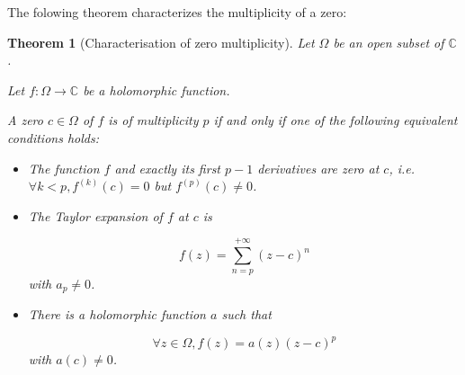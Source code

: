 \documentclass{article}
\newtheorem*{thm*}{Theorem}
\begin{document}
The folowing theorem characterizes the multiplicity of a zero:
\begin{thm*}
    [Characterisation of zero multiplicity]
    Let $\Omega$ be an open subset of $\mathbb{C}$.

    Let $f: \Omega \rightarrow \mathbb{C}$ be a holomorphic function.

    A zero $c\in\Omega$ of $f$ is of multiplicity $p$ if and only if one of the following equivalent conditions holds:

    \begin{itemize}
        \item The function $f$ and exactly its first $p-1$ derivatives are zero at $c$, i.e. $\forall k < p, f^{(k)}(c) = 0$ but $f^{(p)}(c) \neq 0$.

        \item The Taylor expansion of $f$ at $c$ is 

            $$ f(z) = \sum_{n=p}^{+\infty}(z-c)^n$$ with $a_p\neq 0$.

        \item There is a holomorphic function $a$ such that 

            $$ \forall z\in\Omega, f(z) = a(z) (z-c)^p$$
            with $a(c) \neq 0$.
    \end{itemize}


\end{thm*}
\end{document}
